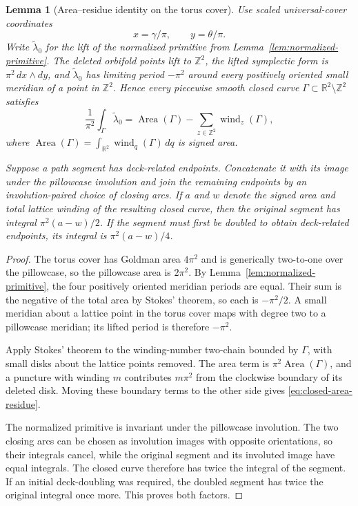 \documentclass[11pt,reqno]{amsart}
\theoremstyle{plain}
\newtheorem{lemma}[theorem]{Lemma}
\theoremstyle{definition}
\newcommand{\R}{\mathbb{R}}
\newcommand{\Z}{\mathbb{Z}}
\begin{document}
\begin{lemma}[Area--residue identity on the torus cover]\label{lem:area-residue}
Use scaled universal-cover coordinates
\[
 x=\gamma/\pi,\qquad y=\theta/\pi.
\]
Write $\widetilde\lambda_0$ for the lift of the normalized primitive from
Lemma~\ref{lem:normalized-primitive}.  The deleted orbifold points lift to $\Z^2$, the lifted
symplectic form is $\pi^2\,dx\wedge dy$, and $\widetilde\lambda_0$ has limiting period
$-\pi^2$ around every positively oriented small meridian of a point in $\Z^2$.  Hence every
piecewise smooth closed curve $\Gamma\subset\R^2\setminus\Z^2$ satisfies
\begin{equation}\label{eq:closed-area-residue}
 \frac1{\pi^2}\int_\Gamma\widetilde\lambda_0
 =\operatorname{Area}(\Gamma)
  -\sum_{z\in\Z^2}\operatorname{wind}_z(\Gamma),
\end{equation}
where
$\operatorname{Area}(\Gamma)=\int_{\R^2}\operatorname{wind}_q(\Gamma)\,dq$ is signed area.

Suppose a path segment has deck-related endpoints.  Concatenate it with its image under the
pillowcase involution and join the remaining endpoints by an involution-paired choice of closing
arcs.  If $a$ and $w$ denote the signed area and total lattice winding of the resulting closed
curve, then the original segment has integral $\pi^2(a-w)/2$.  If the segment must first be
doubled to obtain deck-related endpoints, its integral is $\pi^2(a-w)/4$.
\end{lemma}

\begin{proof}
The torus cover has Goldman area $4\pi^2$ and is generically two-to-one over the pillowcase, so the
pillowcase area is $2\pi^2$.  By Lemma~\ref{lem:normalized-primitive}, the four positively
oriented meridian periods are equal.  Their sum is the negative of the total area by Stokes'
theorem, so each is $-\pi^2/2$.  A small meridian about a lattice point in the torus cover maps
with degree two to a pillowcase meridian; its lifted period is therefore $-\pi^2$.

Apply Stokes' theorem to the winding-number two-chain bounded by $\Gamma$, with small disks about
the lattice points removed.  The area term is $\pi^2\operatorname{Area}(\Gamma)$, and a puncture
with winding $m$ contributes $m\pi^2$ from the clockwise boundary of its deleted disk.  Moving
these boundary terms to the other side gives \eqref{eq:closed-area-residue}.

The normalized primitive is invariant under the pillowcase involution.  The two closing arcs can
be chosen as involution images with opposite orientations, so their integrals cancel, while the
original segment and its involuted image have equal integrals.  The closed curve therefore has
twice the integral of the segment.  If an initial deck-doubling was required, the doubled segment
has twice the original integral once more.  This proves both factors.
\end{proof}
\end{document}
